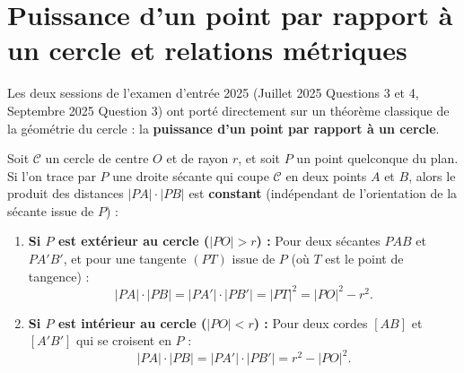 \section{Puissance d'un point par rapport à un cercle et relations métriques}

Les deux sessions de l'examen d'entrée 2025 (Juillet 2025 Questions 3 et 4, Septembre 2025 Question 3) ont porté directement sur un théorème classique de la géométrie du cercle : la \textbf{puissance d'un point par rapport à un cercle}.

\begin{theoreme}
Soit $\mathcal{C}$ un cercle de centre $O$ et de rayon $r$, et soit $P$ un point quelconque du plan. Si l'on trace par $P$ une droite sécante qui coupe $\mathcal{C}$ en deux points $A$ et $B$, alors le produit des distances $|PA| \cdot |PB|$ est \textbf{constant} (indépendant de l'orientation de la sécante issue de $P$) :
\begin{enumerate}
    \item \textbf{Si $P$ est extérieur au cercle ($|PO| > r$) :} Pour deux sécantes $PAB$ et $PA'B'$, et pour une tangente $(PT)$ issue de $P$ (où $T$ est le point de tangence) :
    \[
        \boxed{|PA| \cdot |PB| = |PA'| \cdot |PB'| = |PT|^2 = |PO|^2 - r^2}.
    \]
    \item \textbf{Si $P$ est intérieur au cercle ($|PO| < r$) :} Pour deux cordes $[AB]$ et $[A'B']$ qui se croisent en $P$ :
    \[
        \boxed{|PA| \cdot |PB| = |PA'| \cdot |PB'| = r^2 - |PO|^2}.
    \]
\end{enumerate}
\end{theoreme}

